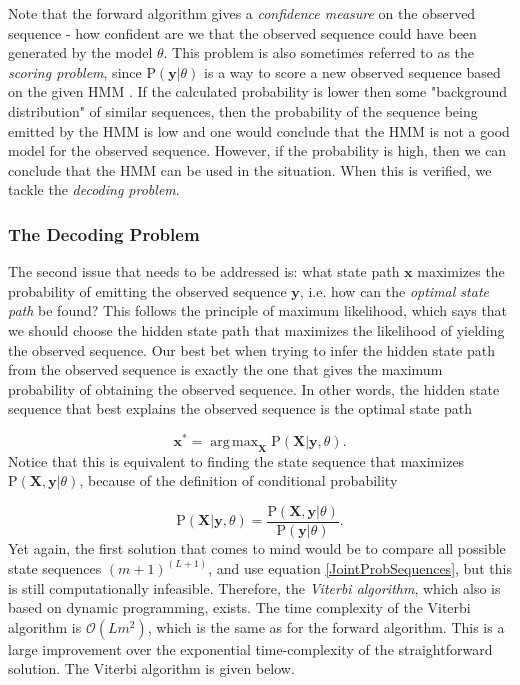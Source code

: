 \documentclass{article}\usepackage[]{graphicx}\usepackage[]{color}
\DeclareMathOperator*{\argmax}{arg\,max}
\begin{document}
Note that the forward algorithm gives a \textit{confidence measure} on the observed sequence - how confident are we that the observed sequence could have been generated by the model $\theta$. This problem is also sometimes referred to as the \textit{scoring problem}, since $\text{P}(\mathbf{y}|\theta)$ is a way to score a new observed sequence based on the given HMM \cite{Yoon2009}. If the calculated probability is lower then some "background distribution" of similar sequences, then the probability of the sequence being emitted by the HMM is low and one would conclude that the HMM is not a good model for the observed sequence. However, if the probability is high, then we can conclude that the HMM can be used in the situation. When this is verified, we tackle the \textit{decoding problem}.

\subsubsection{The Decoding Problem}
The second issue that needs to be addressed is: what state path $\mathbf{x}$ maximizes the probability of emitting the observed sequence $\mathbf{y}$, i.e. how can the \textit{optimal state path} be found? This follows the principle of maximum likelihood, which says that we should choose the hidden state path that maximizes the likelihood of yielding the observed sequence. Our best bet when trying to infer the hidden state path from the observed sequence is exactly the one that gives the maximum probability of obtaining the observed sequence. In other words, the hidden state sequence that best explains the observed sequence is the optimal state path

\begin{equation}
    \mathbf{x^*} = \argmax_\mathbf{X} \text{P}(\mathbf{X}|\mathbf{y}, \theta).
    \label{optimalStatePath}
\end{equation}
Notice that this is equivalent to finding the state sequence that maximizes $\text{P}(\mathbf{X}, \mathbf{y}|\theta)$, because of the definition of conditional probability  

\begin{equation*}
    \text{P}(\mathbf{X}|\mathbf{y}, \theta) = \frac{\text{P}(\mathbf{X}, \mathbf{y}|\theta)}{\text{P}(\mathbf{y}|\theta)}.
\end{equation*}
Yet again, the first solution that comes to mind would be to compare all possible state sequences $(m+1)^{(L+1)}$, and use equation \eqref{JointProbSequences}, but this is still computationally infeasible. Therefore, the \textit{Viterbi algorithm}, which also is based on dynamic programming, exists. The time complexity of the Viterbi algorithm is $\mathcal{O}(Lm^2)$, which is the same as for the forward algorithm. This is a large improvement over the exponential time-complexity of the straightforward solution. The Viterbi algorithm is given below. 
\end{document}
